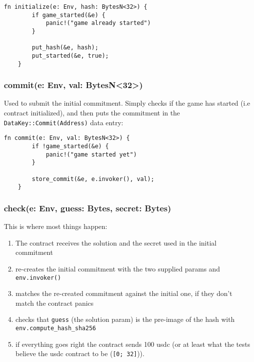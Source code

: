 \documentclass[10pt]{article}
\begin{document}
\begin{verbatim}
fn initialize(e: Env, hash: BytesN<32>) {
        if game_started(&e) {
            panic!("game already started")
        }

        put_hash(&e, hash);
        put_started(&e, true);
    }
\end{verbatim}

\subsubsection*{commit(e: Env, val: BytesN<32>)}
Used to submit the initial commitment. Simply checks if the game has started (i.e contract initialized), and then puts the commitment in the \texttt{DataKey::Commit(Address)} data entry:

\begin{verbatim}
fn commit(e: Env, val: BytesN<32>) {
        if !game_started(&e) {
            panic!("game started yet")
        }

        store_commit(&e, e.invoker(), val);
    }
\end{verbatim}

\subsubsection*{check(e: Env, guess: Bytes, secret: Bytes)}
This is where most things happen:

\begin{enumerate}
  \item The contract receives the solution and the secret used in the initial commitment
  \item re-creates the initial commitment with the two supplied params and \texttt{env.invoker()}
  \item matches the re-created commitment against the initial one, if they don't match the contract panics
  \item checks that \texttt{guess} (the solution param) is the pre-image of the hash with \texttt{env.compute\_hash\_sha256}
  \item if everything goes right the contract sends 100 usdc (or at least what the tests believe the usdc contract to be (\texttt{[0; 32]})).
\end{enumerate}
\end{document}
